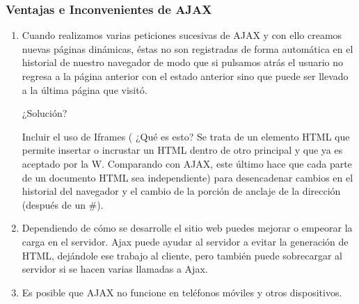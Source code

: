 \documentclass{apuntes}
\begin{document}
\subsubsection{Ventajas e Inconvenientes de AJAX}
\begin{enumerate}
\item Cuando realizamos varias peticiones sucesivas de AJAX y con ello creamos nuevas páginas dinámicas, éstas no son registradas de forma automática en el historial de nuestro navegador de modo que si pulsamos atrás el usuario no regresa a la página anterior con el estado anterior sino que puede ser llevado a la última página que visitó.

 ¿Solución? 

Incluir el uso de Iframes ( ¿Qué es esto?  Se trata de un elemento HTML que permite insertar o incrustar un HTML dentro de otro principal y que ya es aceptado por la W. Comparando con AJAX, este último hace que cada parte de un documento HTML sea independiente) para desencadenar cambios en el historial del navegador y el cambio de la porción de anclaje de la dirección (después de un \#).

\item Dependiendo de cómo  se desarrolle el sitio web puedes mejorar o empeorar la carga en el servidor. Ajax puede ayudar al servidor a evitar la  generación de HTML, dejándole ese trabajo al cliente, pero también puede sobrecargar al servidor si se hacen varias llamadas a Ajax.

\item Es posible que AJAX no funcione en teléfonos móviles y otros dispositivos.

\end{enumerate}
\end{document}
